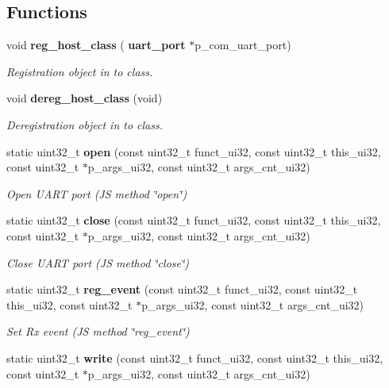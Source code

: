 \subsection*{Functions}
\begin{DoxyCompactItemize}
\item 
void \textbf{ reg\+\_\+host\+\_\+class} (\textbf{ uart\+\_\+port} $\ast$p\+\_\+com\+\_\+uart\+\_\+port)
\begin{DoxyCompactList}\small\item\em Registration object in to class. \end{DoxyCompactList}\item 
void \textbf{ dereg\+\_\+host\+\_\+class} (void)
\begin{DoxyCompactList}\small\item\em Deregistration object in to class. \end{DoxyCompactList}\item 
static uint32\+\_\+t \textbf{ open} (const uint32\+\_\+t funct\+\_\+ui32, const uint32\+\_\+t this\+\_\+ui32, const uint32\+\_\+t $\ast$p\+\_\+args\+\_\+ui32, const uint32\+\_\+t args\+\_\+cnt\+\_\+ui32)
\begin{DoxyCompactList}\small\item\em Open U\+A\+RT port (JS method \char`\"{}open\char`\"{}) \end{DoxyCompactList}\item 
static uint32\+\_\+t \textbf{ close} (const uint32\+\_\+t funct\+\_\+ui32, const uint32\+\_\+t this\+\_\+ui32, const uint32\+\_\+t $\ast$p\+\_\+args\+\_\+ui32, const uint32\+\_\+t args\+\_\+cnt\+\_\+ui32)
\begin{DoxyCompactList}\small\item\em Close U\+A\+RT port (JS method \char`\"{}close\char`\"{}) \end{DoxyCompactList}\item 
static uint32\+\_\+t \textbf{ reg\+\_\+event} (const uint32\+\_\+t funct\+\_\+ui32, const uint32\+\_\+t this\+\_\+ui32, const uint32\+\_\+t $\ast$p\+\_\+args\+\_\+ui32, const uint32\+\_\+t args\+\_\+cnt\+\_\+ui32)
\begin{DoxyCompactList}\small\item\em Set Rx event (JS method \char`\"{}reg\+\_\+event\char`\"{}) \end{DoxyCompactList}\item 
static uint32\+\_\+t \textbf{ write} (const uint32\+\_\+t funct\+\_\+ui32, const uint32\+\_\+t this\+\_\+ui32, const uint32\+\_\+t $\ast$p\+\_\+args\+\_\+ui32, const uint32\+\_\+t args\+\_\+cnt\+\_\+ui32)

\end{DoxyCompactItemize}
